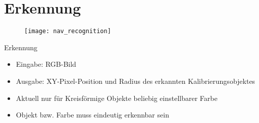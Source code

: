 
\section{Erkennung}

\begin{frame}[b]
	\begin{figure}
		\texttt{[image: nav\_recognition]}
	\end{figure}
	\vspace*{0.7cm}
\end{frame}

\begin{frame}[t]{Erkennung}
	\begin{itemize}
		\item Eingabe: RGB-Bild
		\item Ausgabe: XY-Pixel-Position und Radius des erkannten
			Kalibrierungsobjektes
		\item Aktuell nur für Kreisförmige Objekte beliebig einstellbarer
			Farbe
		\item Objekt bzw. Farbe muss eindeutig erkennbar sein
	\end{itemize}
\end{frame}

